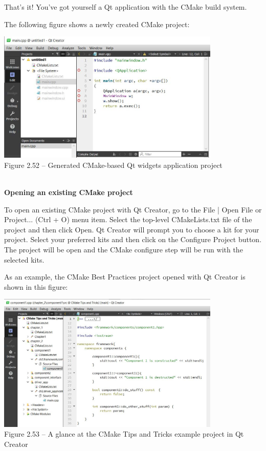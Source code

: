 That's it! You've got yourself a Qt application with the CMake build system.

The following figure shows a newly created CMake project:

\begin{center}
\includegraphics[width=0.8\textwidth]{content/1/chapter2/images/52.jpg}\\
Figure 2.52 – Generated CMake-based Qt widgets application project
\end{center}

\hspace*{\fill} \\ %
\noindent
\textbf{Opening an existing CMake project}

To open an existing CMake project with Qt Creator, go to the File | Open File or Project... (Ctrl + O) menu item. Select the top-level CMakeLists.txt file of the project and then click Open. Qt Creator will prompt you to choose a kit for your project. Select your preferred kits and then click on the Configure Project button. The project will be open and the CMake configure step will be run with the selected kits.

As an example, the CMake Best Practices project opened with Qt Creator is shown in this figure:

\begin{center}
\includegraphics[width=0.8\textwidth]{content/1/chapter2/images/53.jpg}\\
Figure 2.53 – A glance at the CMake Tips and Tricks example project in Qt Creator
\end{center}

